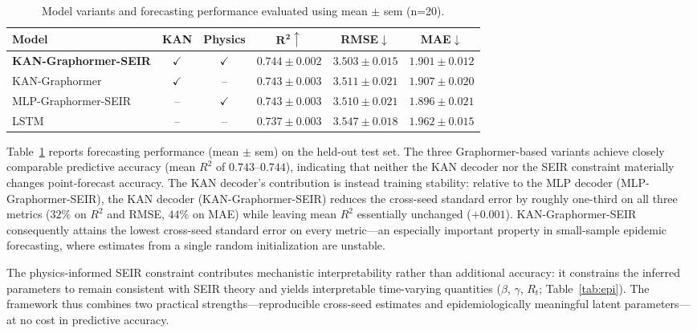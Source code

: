 \documentclass[10pt,letterpaper]{article}
\begin{document}
	\begin{table}[H]
		\centering
		\caption{Model variants and forecasting performance evaluated using mean $\pm$ sem (n=20).}
		\label{tab:results}
		\small\setlength{\tabcolsep}{6pt}
		\begin{tabular}{@{}lccccc@{}}
			\toprule
			\textbf{Model} & \textbf{KAN} & \textbf{Physics} & $\boldsymbol{R^2}\uparrow$ & \textbf{RMSE}$\downarrow$ & \textbf{MAE}$\downarrow$ \\
			\midrule
			\textbf{KAN-Graphormer-SEIR} & $\checkmark$ & $\checkmark$ & $\mathbf{0.744 \pm 0.002}$ & $\mathbf{3.503 \pm 0.015}$ & $\mathbf{1.901 \pm 0.012}$ \\
			KAN-Graphormer & $\checkmark$ & --   & $0.743 \pm 0.003$ & $3.511 \pm 0.021$ & $1.907 \pm 0.020$ \\
			MLP-Graphormer-SEIR & --   & $\checkmark$ & $0.743 \pm 0.003$ & $3.510 \pm 0.021$ & $1.896 \pm 0.021$ \\
			LSTM            & --   & --   & $0.737 \pm 0.003$ & $3.547 \pm 0.018$ & $1.962 \pm 0.015$ \\
			\bottomrule
		\end{tabular}
	\end{table}
	
	Table~\ref{tab:results} reports forecasting performance (mean $\pm$ sem) on the held-out test set. The three Graphormer-based variants achieve closely comparable predictive accuracy (mean $R^2$ of $0.743$--$0.744$), indicating that neither the KAN decoder nor the SEIR constraint materially changes point-forecast accuracy. The KAN decoder's contribution is instead training stability: relative to the MLP decoder (MLP-Graphormer-SEIR), the KAN decoder (KAN-Graphormer-SEIR) reduces the cross-seed standard error by roughly one-third on all three metrics ($32\%$ on $R^2$ and RMSE, $44\%$ on MAE) while leaving mean $R^2$ essentially unchanged ($+0.001$). KAN-Graphormer-SEIR consequently attains the lowest cross-seed standard error on every metric---an especially important property in small-sample epidemic forecasting, where estimates from a single random initialization are unstable.
	
	The physics-informed SEIR constraint contributes mechanistic interpretability rather than additional accuracy: it constrains the inferred parameters to remain consistent with SEIR theory and yields interpretable time-varying quantities ($\beta$, $\gamma$, $R_t$; Table~\ref{tab:epi}). The framework thus combines two practical strengths---reproducible cross-seed estimates and epidemiologically meaningful latent parameters---at no cost in predictive accuracy.
	
\end{document}
